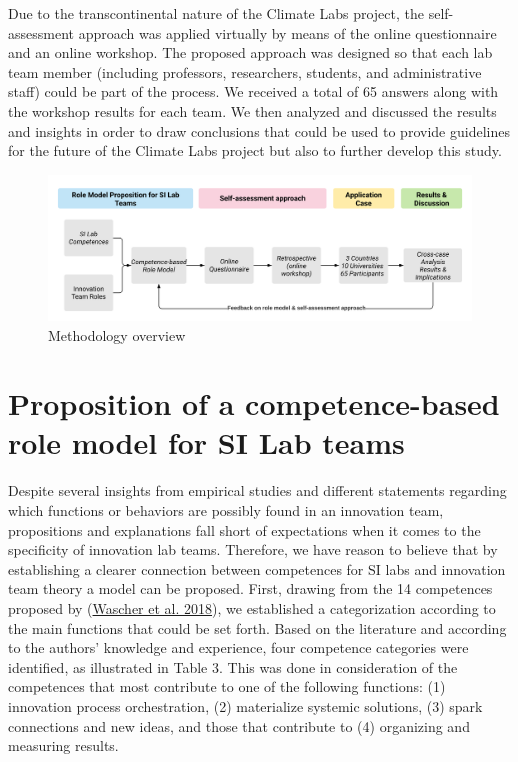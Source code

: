 \documentclass[AMA,STIX1COL,APA,STIX2COL]{WileyNJD-v2}
\begin{document}
Due to the transcontinental nature of the Climate Labs project, the
self-assessment approach was applied virtually by means of the online
questionnaire and an online workshop. The proposed approach was designed
so that each lab team member (including professors, researchers,
students, and administrative staff) could be part of the process. We
received a total of 65 answers along with the workshop results for each
team. We then analyzed and discussed the results and insights in order
to draw conclusions that could be used to provide guidelines for the
future of the Climate Labs project but also to further develop this
study.

\begin{figure}

{\centering \includegraphics[width=0.95\linewidth]{Figures/Figure 1 - Methodology} 

}

\caption{Methodology overview}\label{fig:Fig1}
\end{figure}

\hypertarget{proposition-of-a-competence-based-role-model-for-si-lab-teams}{%
\section{Proposition of a competence-based role model for SI Lab
teams}\label{proposition-of-a-competence-based-role-model-for-si-lab-teams}}

Despite several insights from empirical studies and different statements
regarding which functions or behaviors are possibly found in an
innovation team, propositions and explanations fall short of
expectations when it comes to the specificity of innovation lab teams.
Therefore, we have reason to believe that by establishing a clearer
connection between competences for SI labs and innovation team theory a
model can be proposed. First, drawing from the 14 competences proposed
by (\protect\hyperlink{ref-Wascher2018}{Wascher et al. 2018}), we
established a categorization according to the main functions that could
be set forth. Based on the literature and according to the authors'
knowledge and experience, four competence categories were identified, as
illustrated in Table 3. This was done in consideration of the
competences that most contribute to one of the following functions: (1)
innovation process orchestration, (2) materialize systemic solutions,
(3) spark connections and new ideas, and those that contribute to (4)
organizing and measuring results.
\end{document}
